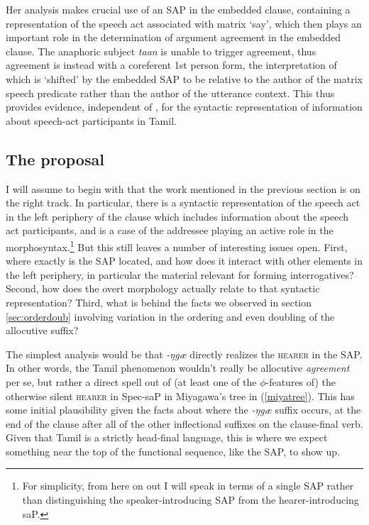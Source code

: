 \documentclass[output=paper, modfonts, nonflat]{langsci/langscibook}
\begin{document}
Her analysis makes crucial use of an SAP in the embedded clause,
containing a representation of the speech act associated with matrix
`say', which then plays an important role in the determination of
argument agreement in the embedded clause. The anaphoric subject
\textit{taan} is unable to trigger agreement, thus agreement is
instead with a coreferent 1st person form, the interpretation of which
is `shifted' by the embedded SAP to be relative to the author of the
matrix speech predicate rather than the author of the utterance
context. This thus provides evidence, independent of \allagr, for the
syntactic representation of information about speech-act participants
in Tamil.

\subsection{The proposal}
\label{sec:account}

I will assume to begin with that the work mentioned in the previous
section is on the right track. In particular, there is a syntactic
representation of the speech act in the left periphery of the clause
which includes information about the speech act participants, and
\allagr{} is a case of the addressee playing an active role in the
morphosyntax.\footnote{For simplicity, from here on out I will speak
  in terms of a single SAP rather than distinguishing the
  speaker-introducing SAP from the hearer-introducing saP.} But this
still leaves a number of interesting issues open. First, where exactly
is the SAP located, and how does it interact with other elements in
the left periphery, in particular the material relevant for forming
interrogatives? Second, how does the overt \allagr{} morphology
actually relate to that syntactic representation?  Third, what is
behind the facts we observed in section \ref{sec:orderdoub} involving
variation in the ordering and even doubling of the allocutive suffix?

The simplest analysis would be that \textit{-ŋgæ} directly realizes
the \textsc{hearer} in the SAP.  In other words, the Tamil phenomenon
wouldn't really be allocutive \textit{agreement} per se, but rather a
direct spell out of (at least one of the $\phi$-features of) the
otherwise silent \textsc{hearer} in Spec-saP in Miyagawa's tree in
(\ref{miyatree}). This has some initial plausibility given the facts
about where the \textit{-ŋgæ} suffix occurs, at the end of the clause
after all of the other inflectional suffixes on the clause-final verb.
Given that Tamil is a strictly head-final language, this is where we
expect something near the top of the functional sequence, like the
SAP, to show up.
\end{document}
